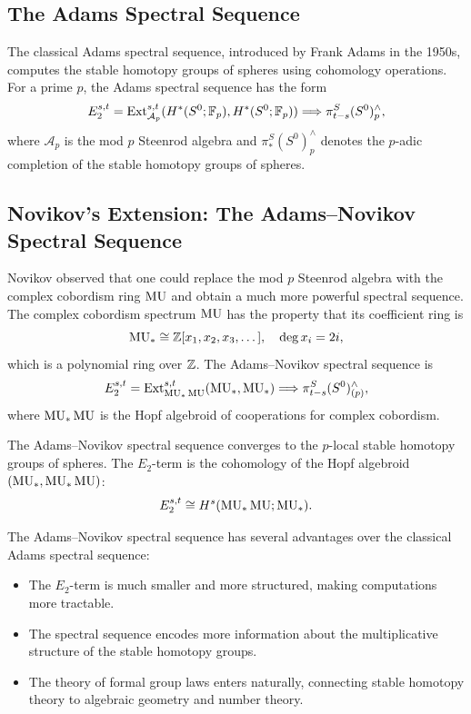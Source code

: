 \subsection{The Adams Spectral Sequence}

The classical Adams spectral sequence, introduced by Frank Adams in the 1950s, computes the stable homotopy groups of spheres using cohomology operations. For a prime \(p\), the Adams spectral sequence has the form
\[
E_2^{s,t} = \operatorname{Ext}_{\mathcal{A}_p}^{s,t}(H^*(S^0; \mathbb{F}_p), H^*(S^0; \mathbb{F}_p)) \Longrightarrow \pi_{t-s}^S(S^0)_p^{\wedge},
\]
where \(\mathcal{A}_p\) is the mod \(p\) Steenrod algebra and \(\pi_*^S(S^0)_p^{\wedge}\) denotes the \(p\)-adic completion of the stable homotopy groups of spheres.

\subsection{Novikov's Extension: The Adams--Novikov Spectral Sequence}

Novikov observed that one could replace the mod \(p\) Steenrod algebra with the complex cobordism ring \(\operatorname{MU}\) and obtain a much more powerful spectral sequence. The complex cobordism spectrum \(\operatorname{MU}\) has the property that its coefficient ring is
\[
\operatorname{MU}_* \cong \mathbb{Z}[x_1, x_2, x_3, \dots], \quad \deg x_i = 2i,
\]
which is a polynomial ring over \(\mathbb{Z}\). The Adams--Novikov spectral sequence is
\[
E_2^{s,t} = \operatorname{Ext}_{\operatorname{MU}_*\operatorname{MU}}^{s,t}(\operatorname{MU}_*, \operatorname{MU}_*) \Longrightarrow \pi_{t-s}^S(S^0)_{(p)}^{\wedge},
\]
where \(\operatorname{MU}_*\operatorname{MU}\) is the Hopf algebroid of cooperations for complex cobordism.

\begin{theorem}
The Adams--Novikov spectral sequence converges to the \(p\)-local stable homotopy groups of spheres. The \(E_2\)-term is the cohomology of the Hopf algebroid \((\operatorname{MU}_*, \operatorname{MU}_*\operatorname{MU})\):
\[
E_2^{s,t} \cong H^s(\operatorname{MU}_*\operatorname{MU}; \operatorname{MU}_*).
\]
\end{theorem}

The Adams--Novikov spectral sequence has several advantages over the classical Adams spectral sequence:
\begin{itemize}
    \item The \(E_2\)-term is much smaller and more structured, making computations more tractable.
    \item The spectral sequence encodes more information about the multiplicative structure of the stable homotopy groups.
    \item The theory of formal group laws enters naturally, connecting stable homotopy theory to algebraic geometry and number theory.
\end{itemize}

